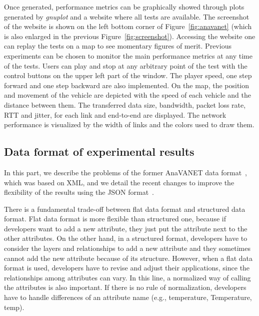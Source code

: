 \documentclass[fonts]{icst}
\begin{document}
Once generated, performance metrics can be graphically showed through plots generated by \textit{gnuplot} and a website where all tests are available. The screenshot of the website is shown on the left bottom corner of Figure~\ref{fig:anavanet} (which is also enlarged in the previous Figure~\ref{fig:screenshot}). Accessing the website one can replay the tests on a map to see momentary figures of merit. 
Previous experiments can be chosen to monitor the main performance metrics at any time of the tests. Users can play and stop at any arbitrary point of the test with the
control buttons on the upper left part of the window. The player speed, one step forward
and one step backward are also implemented.
On the map, the position and
movement of the vehicle are depicted with the speed of each vehicle and the
distance between them. The transferred data size, bandwidth, packet loss rate,
RTT and jitter, for each link and end-to-end are displayed. The network
performance is visualized by the width of links and the colors used to
draw them.







\subsection{Data format of experimental results}
\label{lbl:data-format}

In this part, we describe the problems of the former AnaVANET data format~\cite{Tsukada2014}, which was based on XML, and we detail the recent changes to improve the flexibility of the results using the JSON format~\cite{rfc7159}.

There is a fundamental trade-off between flat data format and structured data
format. Flat data format is more flexible than structured one, because if
developers want to add a new attribute, they just put the attribute next to the other
attributes. On the other hand, in a structured format, developers
have to consider the layers and relationships to add a new attribute and they
sometimes cannot add the new attribute because of its structure. However, when a flat data format is used, developers have to revise and adjust their applications, since the relationships among
attributes can vary. In this line, a normalized way of calling the attributes is also important. If there is no
rule of normalization, developers have to handle differences of an attribute
name (e.g., temperature, Temperature, temp). 
\end{document}
